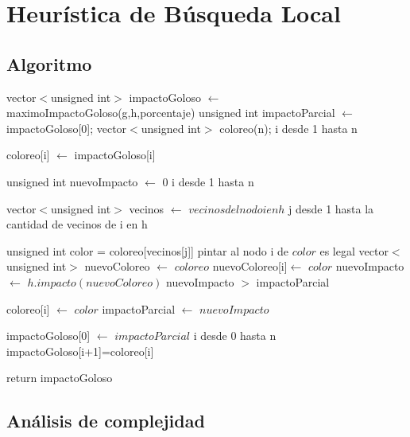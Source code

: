 \section{Heurística de Búsqueda Local}

\subsection{Algoritmo}

\begin{algorithm}[H]
\caption{} 
\begin{codebox}

\li
\li vector$<$unsigned int$>$ impactoGoloso  $\gets$ maximoImpactoGoloso(g,h,porcentaje)
\li unsigned int impactoParcial $\gets$ impactoGoloso[0];
\li vector$<$unsigned int$>$ coloreo(n);
\li
\li \For i desde 1 hasta n \Do
    
\li 	coloreo[i] $\gets$ impactoGoloso[i]
    
    \End
\li

\li unsigned int nuevoImpacto $\gets$ 0
\li
\li	\For i desde 1 hasta n \Do
	
\li
\li		vector$<$unsigned int$>$ vecinos $\gets$ $vecinos del nodo i en h$
\li
\li 	\For j desde 1 hasta la cantidad de vecinos de i en h \Do

\li				unsigned int color = coloreo[vecinos[j]]
\li
\li				\If pintar al nodo i de $color$ es legal \Do			
\li						vector$<$unsigned int$>$ nuevoColoreo $\gets$ \quad $coloreo$
\li						nuevoColoreo[i]$ \gets$ \quad $color$
\li                		nuevoImpacto $ \gets$ \quad $h.impacto(nuevoColoreo)$
\li
\li                		\If nuevoImpacto $>$ impactoParcial \Do
                
\li                			coloreo[i] $\gets$ \quad $color$
\li                   			impactoParcial $\gets$ \quad $nuevoImpacto$
                   		\End
\li
                \End
        \End
    \End

\li
\li		impactoGoloso[0] $\gets$ \quad $impactoParcial$
\li
\li \For i desde 0 hasta n \Do
\li		impactoGoloso[i+1]=coloreo[i]
	\End    

\li
\li return impactoGoloso
\End
\end{codebox}
\end{algorithm}

\subsection{Análisis de complejidad}

